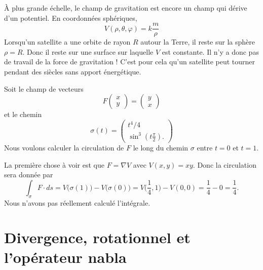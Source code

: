 \begin{example}
    À plus grande échelle, le champ de gravitation est encore un champ qui dérive d'un potentiel. En coordonnées sphériques,
    \begin{equation}
        V(\rho,\theta,\varphi)=k\frac{ m }{ \rho }
    \end{equation}
    Lorsqu'un satellite a une orbite de rayon $R$ autour la Terre, il reste sur la sphère $\rho=R$. Donc il reste sur une surface sur laquelle $V$ est constante. Il n'y a donc pas de travail de la force de gravitation ! C'est pour cela qu'un satellite peut tourner pendant des siècles sans apport énergétique.
\end{example}

\begin{example}
    Soit le champ de vecteurs
    \begin{equation}
        F\begin{pmatrix}
            x    \\ 
            y    
        \end{pmatrix}=\begin{pmatrix}
            y    \\ 
            x    
        \end{pmatrix}
    \end{equation}
    et le chemin
    \begin{equation}
        \sigma(t)=\begin{pmatrix}
            t^4/4    \\ 
            \sin^3(t\frac{ \pi }{2}).    
        \end{pmatrix}
    \end{equation}
    Nous voulons calculer la circulation de $F$ le long du chemin $\sigma$ entre $t=0$ et $t=1$.

    La première chose à voir est que $F=\nabla V$ avec $V(x,y)=xy$. Donc la circulation sera donnée par
    \begin{equation}
        \int_{\sigma}F\cdot ds=V\big( \sigma(1) \big)-V\big( \sigma(0) \big)=V\big( \frac{1}{ 4 },1 \big)-V(0,0)=\frac{1}{ 4 }-0=\frac{1}{ 4 }.
    \end{equation}
    Nous n'avons pas réellement calculé l'intégrale.
\end{example}

\section{Divergence, rotationnel et l'opérateur nabla}

